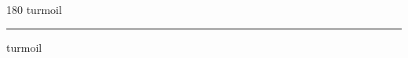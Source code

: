 
\begin{frame}
\begin{center}
\begin{turn}{180}
{\fontsize{2.5cm}{1em}\selectfont turmoil}
\end{turn}
\vspace{1em}\par  
\hrule
\vspace{1em}\par  
{\fontsize{2.5cm}{1em}\selectfont turmoil}
\end{center}
\end{frame}
